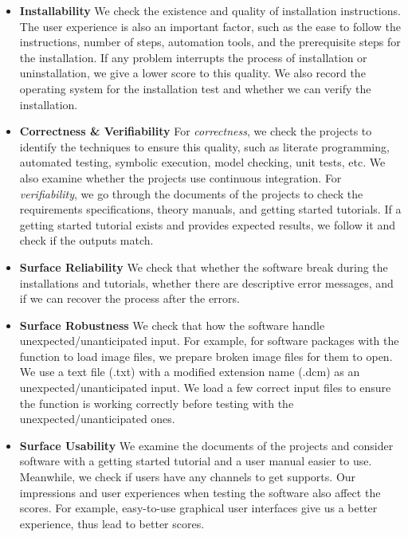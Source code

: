 \begin{itemize}
\item \textbf{Installability} We check the existence and quality of installation instructions. The user experience is also an important factor, such as the ease to follow the instructions, number of steps, automation tools, and the prerequisite steps for the installation. If any problem interrupts the process of installation or uninstallation, we give a lower score to this quality. We also record the operating system for the installation test and whether we can verify the installation.

\item \textbf{Correctness \& Verifiability} For \textit{correctness}, we check the projects to identify the techniques to ensure this quality, such as literate programming, automated testing, symbolic execution, model checking, unit tests, etc. We also examine whether the projects use continuous integration. For \textit{verifiability}, we go through the documents of the projects to check the requirements specifications, theory manuals, and getting started tutorials. If a getting started tutorial exists and provides expected results, we follow it and check if the outputs match.

\item \textbf{Surface Reliability} We check that whether the software break during the installations and tutorials, whether there are descriptive error messages, and if we can recover the process after the errors.

\item \textbf{Surface Robustness} We check that how the software handle unexpected/unanticipated input. For example, for software packages with the function to load image files, we prepare broken image files for them to open. We use a text file (.txt) with a modified extension name (.dcm) as an unexpected/unanticipated input. We load a few correct input files to ensure the function is working correctly before testing with the unexpected/unanticipated ones.

\item \textbf{Surface Usability} We examine the documents of the projects and consider software with a getting started tutorial and a user manual easier to use. Meanwhile, we check if users have any channels to get supports. Our impressions and user experiences when testing the software also affect the scores. For example, easy-to-use graphical user interfaces give us a better experience, thus lead to better scores.


\end{itemize}
